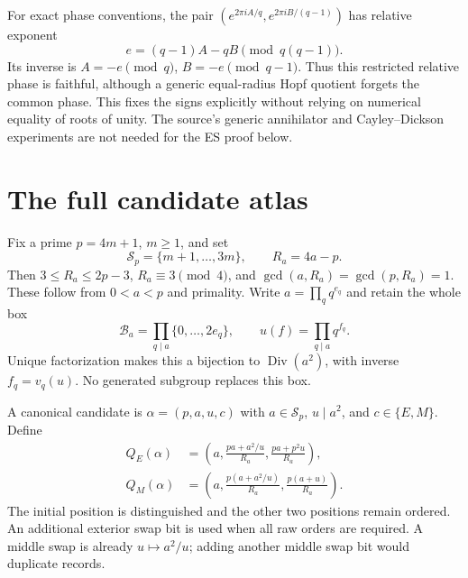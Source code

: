 \documentclass[11pt]{article}
\theoremstyle{definition}\newtheorem{definition}[theorem]{Definition}
\theoremstyle{remark}\newtheorem{remark}[theorem]{Remark}
\newcommand{\Div}{\operatorname{Div}}\newcommand{\supp}{\operatorname{supp}}
\begin{document}
For exact phase conventions, the pair
$(e^{2\pi iA/q},e^{2\pi iB/(q-1)})$ has relative exponent
\[
 e=(q-1)A-qB\pmod{q(q-1)}.
\]
Its inverse is $A=-e\pmod q$, $B=-e\pmod{q-1}$. Thus this restricted
relative phase is faithful, although a generic equal-radius Hopf quotient
forgets the common phase. This fixes the signs explicitly without relying
on numerical equality of roots of unity. The source's generic annihilator
and Cayley--Dickson experiments are not needed for the ES proof below.

\section{The full candidate atlas}
Fix a prime $p=4m+1$, $m\ge1$, and set
\[
 \mathcal S_p=\{m+1,\ldots,3m\},\qquad R_a=4a-p.
\]
Then $3\le R_a\le2p-3$, $R_a\equiv3\pmod4$, and
$\gcd(a,R_a)=\gcd(p,R_a)=1$. These follow from $0<a<p$ and primality.
Write $a=\prod_q q^{e_q}$ and retain the whole box
\[
 \mathcal B_a=\prod_{q\mid a}\{0,\ldots,2e_q\},\qquad
 u(f)=\prod_{q\mid a}q^{f_q}.
\]
Unique factorization makes this a bijection to $\Div(a^2)$, with inverse
$f_q=v_q(u)$. No generated subgroup replaces this box.

A canonical candidate is $\alpha=(p,a,u,c)$ with $a\in\mathcal S_p$,
$u\mid a^2$, and $c\in\{E,M\}$. Define
\begin{align}
 Q_E(\alpha)&=\left(a,\frac{pa+a^2/u}{R_a},\frac{pa+p^2u}{R_a}\right),\label{eq:E}\\
 Q_M(\alpha)&=\left(a,\frac{p(a+a^2/u)}{R_a},\frac{p(a+u)}{R_a}\right).\label{eq:M}
\end{align}
The initial position is distinguished and the other two positions remain
ordered. An additional exterior swap bit is used when all raw orders are
required. A middle swap is already $u\mapsto a^2/u$; adding another middle
swap bit would duplicate records.
\end{document}
